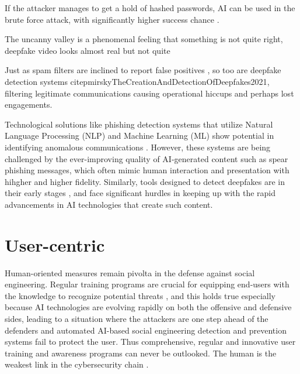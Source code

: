 If the attacker manages to get a hold of hashed passwords, AI can be used in the brute force attack, with significantly higher success chance \citep{blauthArtificialIntelligenceCrimeOverviewMaliciousUseAbuse2022}.

The uncanny valley is a phenomenal feeling that something is not quite right, deepfake video looks almost real but not quite


Just as spam filters are inclined to report false positives \citep{fakhouriAIDrivenSolutionsForSocialEngineeringAttacks2024}, so too are deepfake detection systems citep{mirskyTheCreationAndDetectionOfDeepfakes2021}, filtering legitimate communications causing operational hiccups and perhaps lost engagements.

Technological solutions like phishing detection systems that utilize Natural Language Processing (NLP) and Machine Learning (ML) show potential in identifying anomalous communications \citep{basitComprehensiveSurveyAIenabledPhishingAttacks2021}. However, these systems are being challenged by the ever-improving quality of AI-generated content such as spear phishing messages, which often mimic human interaction and presentation with hihgher and higher fidelity. Similarly, tools designed to detect deepfakes are in their early stages \citep{mirskyTheCreationAndDetectionOfDeepfakes2021}, and face significant hurdles in keeping up with the rapid advancements in AI technologies that create such content.








\section{User-centric}
\begin{comment}    
    - Deepfake content detection
    - Spear phishing detection
\end{comment}

Human-oriented measures remain pivolta in the defense against social engineering. Regular training programs are crucial for equipping end-users with the knowledge to recognize potential threats \citep{hadnagySocialEngineering2018}, and this holds true especially because AI technologies are evolving rapidly on both the offensive and defensive sides, leading to a situation where the attackers are one step ahead of the defenders and automated AI-based social engineering detection and prevention systems fail to protect the user. Thus comprehensive, regular and innovative user training and awareness programs can never be outlooked. The human is the weakest link in the cybersecurity chain \citep{mitnick_The_Art_of_Deception_2003}.

